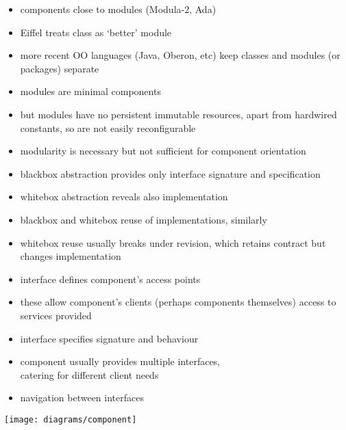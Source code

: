 \documentclass{sepslide-soa-faked} %
\begin{document}
\begin{slide}
\begin{itemize}
\item components close to modules (Modula-2, Ada)
\item Eiffel treats class as `better' module
\item more recent OO languages (Java, Oberon, etc) keep classes and modules
(or packages) separate
\item modules are minimal components
\item but modules have no persistent immutable resources, apart from
hardwired constants, so are not easily reconfigurable
\item modularity is necessary but not sufficient for component orientation
\end{itemize}
\end{slide}

\begin{slide}
\begin{itemize}
\item blackbox abstraction provides only interface signature and specification
\item whitebox abstraction reveals also implementation
\item blackbox and whitebox reuse of implementations, similarly
\item whitebox reuse usually breaks under revision, which retains contract
but changes implementation
\end{itemize}
\end{slide}

\begin{slide}
\begin{itemize}
\item interface defines component's access points
\item these allow component's clients (perhaps components themselves)
access to services provided
\item interface specifies signature and behaviour
\item component usually provides multiple interfaces, \\ 
catering for different client needs
\item navigation between interfaces
\end{itemize}
\vspace*{-0.5in}
\begin{flushright}
\texttt{[image: diagrams/component]}
\end{flushright}
\end{slide}
\end{document}
